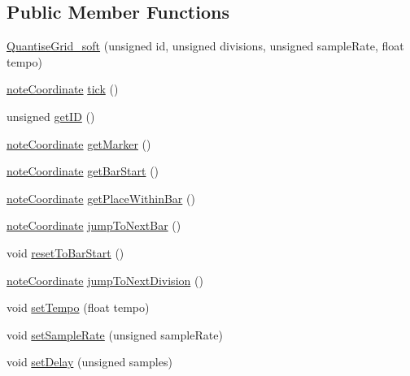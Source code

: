 \subsection*{Public Member Functions}
\begin{DoxyCompactItemize}
\item 
\mbox{\hyperlink{classQuantiseGrid__soft_ab40cf2cb17e78f06519e2aedd8022f8a}{Quantise\+Grid\+\_\+soft}} (unsigned id, unsigned divisions, unsigned sample\+Rate, float tempo)
\item 
\mbox{\hyperlink{structQuantiseGrid__soft_1_1noteCoordinate}{note\+Coordinate}} \mbox{\hyperlink{classQuantiseGrid__soft_a2af018d83f17638adb6483c85b67435f}{tick}} ()
\item 
unsigned \mbox{\hyperlink{classQuantiseGrid__soft_aa3a80d71734e4a258f226fb8317130fa}{get\+ID}} ()
\item 
\mbox{\hyperlink{structQuantiseGrid__soft_1_1noteCoordinate}{note\+Coordinate}} \mbox{\hyperlink{classQuantiseGrid__soft_af75a096d63f430fb9190d0622b55712f}{get\+Marker}} ()
\item 
\mbox{\hyperlink{structQuantiseGrid__soft_1_1noteCoordinate}{note\+Coordinate}} \mbox{\hyperlink{classQuantiseGrid__soft_ae9ba34054f04e9418b2de0a0ce2b4c05}{get\+Bar\+Start}} ()
\item 
\mbox{\hyperlink{structQuantiseGrid__soft_1_1noteCoordinate}{note\+Coordinate}} \mbox{\hyperlink{classQuantiseGrid__soft_a379f20a256203270ddfbee891558fc4e}{get\+Place\+Within\+Bar}} ()
\item 
\mbox{\hyperlink{structQuantiseGrid__soft_1_1noteCoordinate}{note\+Coordinate}} \mbox{\hyperlink{classQuantiseGrid__soft_a8f24b5579033e3bc267d7c2c7457d213}{jump\+To\+Next\+Bar}} ()
\item 
void \mbox{\hyperlink{classQuantiseGrid__soft_a6eadd70b1a9cfe9bb672402e415c8080}{reset\+To\+Bar\+Start}} ()
\item 
\mbox{\hyperlink{structQuantiseGrid__soft_1_1noteCoordinate}{note\+Coordinate}} \mbox{\hyperlink{classQuantiseGrid__soft_a09658510d81c50f2a61b224e760323ef}{jump\+To\+Next\+Division}} ()
\item 
void \mbox{\hyperlink{classQuantiseGrid__soft_a49a982952228b5b76a99911d0fbcf1ab}{set\+Tempo}} (float tempo)
\item 
void \mbox{\hyperlink{classQuantiseGrid__soft_a6486e5f526e5f89209ef9e1bed122bf8}{set\+Sample\+Rate}} (unsigned sample\+Rate)
\item 
void \mbox{\hyperlink{classQuantiseGrid__soft_a1c7a53e2ddb58a78013b870a5828a712}{set\+Delay}} (unsigned samples)

\end{DoxyCompactItemize}
